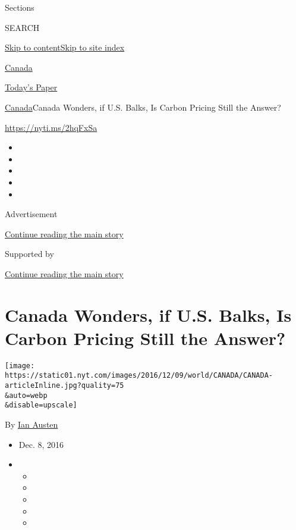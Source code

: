 Sections

SEARCH

\protect\hyperlink{site-content}{Skip to
content}\protect\hyperlink{site-index}{Skip to site index}

\href{https://www.nytimes.com/section/world/canada}{Canada}

\href{https://myaccount.nytimes.com/auth/login?response_type=cookie\&client_id=vi}{}

\href{https://www.nytimes.com/section/todayspaper}{Today's Paper}

\href{/section/world/canada}{Canada}\textbar{}Canada Wonders, if U.S.
Balks, Is Carbon Pricing Still the Answer?

\url{https://nyti.ms/2hqFxSa}

\begin{itemize}
\item
\item
\item
\item
\item
\end{itemize}

Advertisement

\protect\hyperlink{after-top}{Continue reading the main story}

Supported by

\protect\hyperlink{after-sponsor}{Continue reading the main story}

\hypertarget{canada-wonders-if-us-balks-is-carbon-pricing-still-the-answer}{%
\section{Canada Wonders, if U.S. Balks, Is Carbon Pricing Still the
Answer?}\label{canada-wonders-if-us-balks-is-carbon-pricing-still-the-answer}}

\texttt{[image: https://static01.nyt.com/images/2016/12/09/world/CANADA/CANADA-articleInline.jpg?quality=75\\\&auto=webp\\\&disable=upscale]}

By \href{http://www.nytimes.com/by/ian-austen}{Ian Austen}

\begin{itemize}
\item
  Dec. 8, 2016
\item
  \begin{itemize}
  \item
  \item
  \item
  \item
  \item
  \end{itemize}
\end{itemize}

